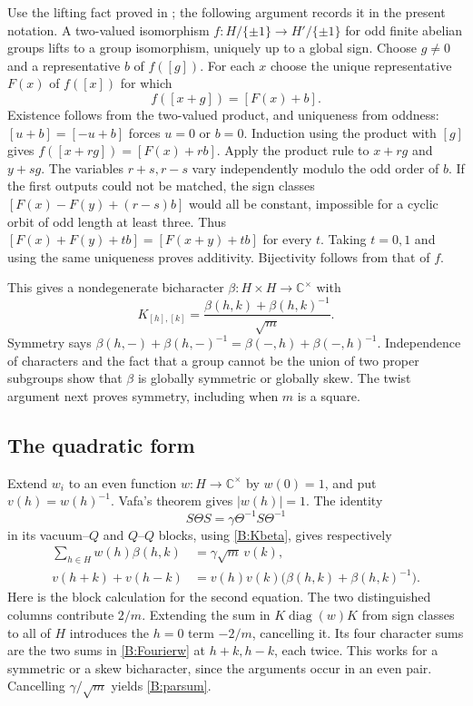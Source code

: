 \documentclass[11pt]{article}
\newcommand{\C}{\mathbb C}\newcommand{\Q}{\mathbb Q}\newcommand{\Z}{\mathbb Z}
\numberwithin{equation}{section}
\begin{document}
Use the lifting fact proved in \cite[Lemma 5.4]{B:GSY}; the following argument records it in the present notation. A two-valued isomorphism $f:H/\{\pm1\}\to H'/\{\pm1\}$ for odd finite abelian groups lifts to a group isomorphism, uniquely up to a global sign. Choose $g\ne0$ and a representative $b$ of $f([g])$. For each $x$ choose the unique representative $F(x)$ of $f([x])$ for which
\[
 f([x+g])=[F(x)+b].
\]
Existence follows from the two-valued product, and uniqueness from oddness: $[u+b]=[-u+b]$ forces $u=0$ or $b=0$. Induction using the product with $[g]$ gives $f([x+rg])=[F(x)+rb]$. Apply the product rule to $x+rg$ and $y+sg$. The variables $r+s,r-s$ vary independently modulo the odd order of $b$. If the first outputs could not be matched, the sign classes $[F(x)-F(y)+(r-s)b]$ would all be constant, impossible for a cyclic orbit of odd length at least three. Thus $[F(x)+F(y)+tb]=[F(x+y)+tb]$ for every $t$. Taking $t=0,1$ and using the same uniqueness proves additivity. Bijectivity follows from that of $f$.

This gives a nondegenerate bicharacter $\beta:H\times H\to\C^\times$ with
\begin{equation}\label{B:Kbeta}
 K_{[h],[k]}=\frac{\beta(h,k)+\beta(h,k)^{-1}}{\sqrt m}.
\end{equation}
Symmetry says $\beta(h,-)+\beta(h,-)^{-1}=\beta(-,h)+\beta(-,h)^{-1}$. Independence of characters and the fact that a group cannot be the union of two proper subgroups show that $\beta$ is globally symmetric or globally skew. The twist argument next proves symmetry, including when $m$ is a square.

\subsection{The quadratic form}
Extend $w_i$ to an even function $w:H\to\C^\times$ by $w(0)=1$, and put $v(h)=w(h)^{-1}$. Vafa's theorem gives $|w(h)|=1$. The identity
\[
 S\Theta S=\gamma\Theta^{-1}S\Theta^{-1}
\]
in its vacuum--$Q$ and $Q$--$Q$ blocks, using \eqref{B:Kbeta}, gives respectively
\begin{align}
 \sum_{h\in H}w(h)\beta(h,k)&=\gamma\sqrt m\,v(k),\label{B:Fourierw}\\
 v(h+k)+v(h-k)&=v(h)v(k)\bigl(\beta(h,k)+\beta(h,k)^{-1}\bigr).
 \label{B:parsum}
\end{align}
Here is the block calculation for the second equation. The two distinguished columns contribute $2/m$. Extending the sum in $K\operatorname{diag}(w)K$ from sign classes to all of $H$ introduces the $h=0$ term $-2/m$, cancelling it. Its four character sums are the two sums in \eqref{B:Fourierw} at $h+k,h-k$, each twice. This works for a symmetric or a skew bicharacter, since the arguments occur in an even pair. Cancelling $\gamma/\sqrt m$ yields \eqref{B:parsum}.
\end{document}
